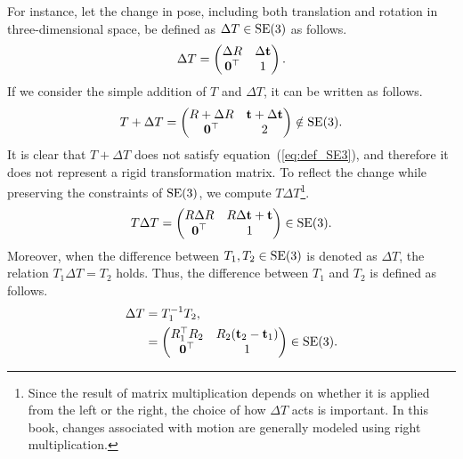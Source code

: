 For instance, let the change in pose, including both translation and rotation in three-dimensional space, be defined as $\Delta T \in {\rm SE}(3)$ as follows.
%
\begin{align}
  \Delta T
%
  = \left( \begin{matrix}
      \Delta R       & \Delta {\bf t} \\
      {\bf 0}^{\top} & 1
    \end{matrix} \right).
\end{align}
%
If we consider the simple addition of $T$ and $\Delta T$, it can be written as follows.
%
\begin{align}
  T + \Delta T
%
  = \left( \begin{matrix}
      R + \Delta R       & {\bf t} + \Delta {\bf t} \\
      {\bf 0}^{\top}     & 2
    \end{matrix} \right) \notin {\rm SE}(3).
\end{align}
%
It is clear that $T + \Delta T$ does not satisfy equation~(\ref{eq:def_SE3}), and therefore it does not represent a rigid transformation matrix.
To reflect the change while preserving the constraints of ${\rm SE}(3)$, we compute $T \Delta T$\footnote{Since the result of matrix multiplication depends on whether it is applied from the left or the right, the choice of how $\Delta T$ acts is important. In this book, changes associated with motion are generally modeled using right multiplication.}.
%
\begin{align}
  T \Delta T
%
  = \left( \begin{matrix}
      R \Delta R     & R \Delta {\bf t} + {\bf t} \\
      {\bf 0}^{\top} & 1
    \end{matrix} \right) \in {\rm SE}(3).
  \label{eq:se3_add}
\end{align}
%
Moreover, when the difference between $T_{1}, T_{2} \in {\rm SE}(3)$ is denoted as $\Delta T$, the relation $T_{1} \Delta T = T_{2}$ holds.
Thus, the difference between $T_{1}$ and $T_{2}$ is defined as follows.
%
\begin{align}
  \begin{split}
    \Delta T
%
    & = T_{1}^{-1} T_{2}, \\
%
    & = \left( \begin{matrix}
          R_{1}^{\top} R_{2} & R_{2} ({\bf t}_{2} - {\bf t}_{1}) \\
          {\bf 0}^{\top}     & 1
        \end{matrix} \right) \in {\rm SE}(3).
  \end{split}
  \label{eq:se3_diff}
\end{align}

